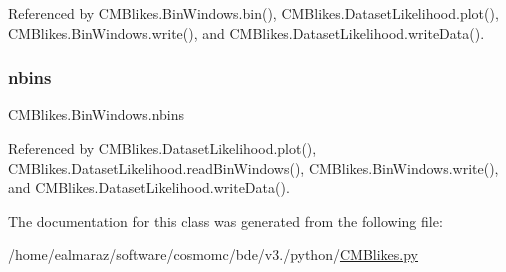 Referenced by C\+M\+Blikes.\+Bin\+Windows.\+bin(), C\+M\+Blikes.\+Dataset\+Likelihood.\+plot(), C\+M\+Blikes.\+Bin\+Windows.\+write(), and C\+M\+Blikes.\+Dataset\+Likelihood.\+write\+Data().

\mbox{\label{classCMBlikes_1_1BinWindows_a56ffe316738873f14ef5f72563bce153}} 
\subsubsection{\texorpdfstring{nbins}{nbins}}
{\footnotesize\ttfamily C\+M\+Blikes.\+Bin\+Windows.\+nbins}



Referenced by C\+M\+Blikes.\+Dataset\+Likelihood.\+plot(), C\+M\+Blikes.\+Dataset\+Likelihood.\+read\+Bin\+Windows(), C\+M\+Blikes.\+Bin\+Windows.\+write(), and C\+M\+Blikes.\+Dataset\+Likelihood.\+write\+Data().



The documentation for this class was generated from the following file\+:\begin{DoxyCompactItemize}
\item 
/home/ealmaraz/software/cosmomc/bde/v3./python/\mbox{\hyperlink{CMBlikes_8py}{C\+M\+Blikes.\+py}}\end{DoxyCompactItemize}
